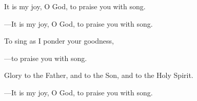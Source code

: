\responsory
\begin{hangpar}

It is my joy, O God, to praise you with song.

{\color{red}---\thinspace}It is my joy, O God, to praise you with song.

\medskip To sing as I ponder your goodness,

{\color{red}---\thinspace}to praise you with song.

\medskip Glory to the Father, and to the Son, and to the Holy Spirit.

{\color{red}---\thinspace}It is my joy, O God, to praise you with song.
\end{hangpar}
